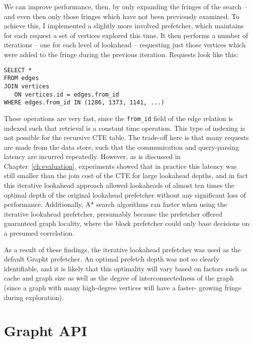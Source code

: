 We can improve performance, then, by only expanding the fringes of the search
-- and even then only those fringes which have not been previously examined.
To achieve this, I implemented a slightly more involved prefetcher, which
maintains for each request a set of vertices explored this time. It then performs
a number of iterations -- one for each level of lookahead -- requesting just those 
vertices which were added to the fringe during the previous iteration. Requests
look like this: 

\begin{verbatim}
SELECT *
FROM edges
JOIN vertices
   ON vertices.id = edges.from_id
WHERE edges.from_id IN (1286, 1373, 1141, ...)
\end{verbatim}

These operations are very fast, since the \texttt{from\_id} field of the edge
relation is indexed such that retrieval is a constant time operation. This
type of indexing is not possible for the recursive CTE table. The trade-off
here is that many requests are made from the data store, such that the
communication and query-parsing latency are incurred repeatedly. However, as
is discussed in Chapter~\ref{ch:evaluation}, experiments showed that in
practice this latency was still smaller than the join cost of the CTE for
large lookahead depths, and in fact this iterative lookahead approach allowed
lookaheads of almost ten times the optimal depth of the original lookahead
prefetcher without any  significant loss of performance. Additionally, A*
search algorithms ran faster when using the iterative lookahead prefetcher,
presumably because the prefetcher offered guaranteed graph locality, where the
block prefetcher could only  base decisions on a presumed correlation.

As a result of these findings, the iterative lookahead prefetcher was used as
the default Grapht prefetcher. An optimal prefetch depth was not so clearly
identifiable, and it is likely that this optimality will vary based on factors
such as cache and graph size as well as the degree of interconnectedness of
the graph (since a graph with many high-degree vertices will have a faster-
growing fringe during exploration).






\section{Grapht API}

